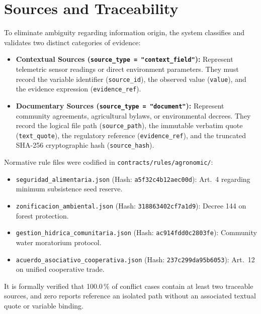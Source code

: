 \documentclass[11pt,a4paper]{article}
\begin{document}
\section{Sources and Traceability}
To eliminate ambiguity regarding information origin, the system classifies and validates two distinct categories of evidence:

\begin{itemize}[leftmargin=*]
    \item \textbf{Contextual Sources (\texttt{source\_type = "context\_field"}):} Represent telemetric sensor readings or direct environment parameters. They must record the variable identifier (\texttt{source\_id}), the observed value (\texttt{value}), and the evidence expression (\texttt{evidence\_ref}).
    \item \textbf{Documentary Sources (\texttt{source\_type = "document"}):} Represent community agreements, agricultural bylaws, or environmental decrees. They record the logical file path (\texttt{source\_path}), the immutable verbatim quote (\texttt{text\_quote}), the regulatory reference (\texttt{evidence\_ref}), and the truncated SHA-256 cryptographic hash (\texttt{source\_hash}).
\end{itemize}

Normative rule files were codified in \texttt{contracts/rules/agronomic/}:
\begin{itemize}
    \item \texttt{seguridad\_alimentaria.json} (Hash: \texttt{a5f32c4b12aec00d}): Art.~4 regarding minimum subsistence seed reserve.
    \item \texttt{zonificacion\_ambiental.json} (Hash: \texttt{318863402cf7a1d9}): Decree 144 on forest protection.
    \item \texttt{gestion\_hidrica\_comunitaria.json} (Hash: \texttt{ac914fdd0c2803fe}): Community water moratorium protocol.
    \item \texttt{acuerdo\_asociativo\_cooperativa.json} (Hash: \texttt{237c299da95b6053}): Art.~12 on unified cooperative trade.
\end{itemize}

It is formally verified that 100.0\,\% of conflict cases contain at least two traceable sources, and zero reports reference an isolated path without an associated textual quote or variable binding.

\end{document}
